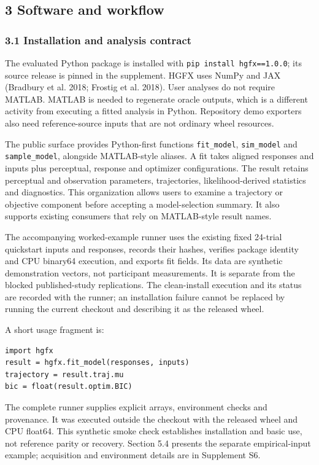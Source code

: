 \documentclass[
  11pt,
]{article}
\begin{document}
\subsection{3 Software and workflow}\label{software-and-workflow}

\subsubsection{3.1 Installation and analysis
contract}\label{installation-and-analysis-contract}

The evaluated Python package is installed with
\texttt{pip\ install\ hgfx==1.0.0}; its source release is pinned in the
supplement. HGFX uses NumPy and JAX (Bradbury et al. 2018; Frostig et
al. 2018). User analyses do not require MATLAB. MATLAB is needed to
regenerate oracle outputs, which is a different activity from executing
a fitted analysis in Python. Repository demo exporters also need
reference-source inputs that are not ordinary wheel resources.

The public surface provides Python-first functions \texttt{fit\_model},
\texttt{sim\_model} and \texttt{sample\_model}, alongside MATLAB-style
aliases. A fit takes aligned responses and inputs plus perceptual,
response and optimizer configurations. The result retains perceptual and
observation parameters, trajectories, likelihood-derived statistics and
diagnostics. This organization allows users to examine a trajectory or
objective component before accepting a model-selection summary. It also
supports existing consumers that rely on MATLAB-style result names.

The accompanying worked-example runner uses the existing fixed 24-trial
quickstart inputs and responses, records their hashes, verifies package
identity and CPU binary64 execution, and exports fit fields. Its data
are synthetic demonstration vectors, not participant measurements. It is
separate from the blocked published-study replications. The
clean-install execution and its status are recorded with the runner; an
installation failure cannot be replaced by running the current checkout
and describing it as the released wheel.

A short usage fragment is:

\begin{verbatim}
import hgfx
result = hgfx.fit_model(responses, inputs)
trajectory = result.traj.mu
bic = float(result.optim.BIC)
\end{verbatim}

The complete runner supplies explicit arrays, environment checks and
provenance. It was executed outside the checkout with the released wheel
and CPU float64. This synthetic smoke check establishes installation and
basic use, not reference parity or recovery. Section 5.4 presents the
separate empirical-input example; acquisition and environment details
are in Supplement S6.
\end{document}
